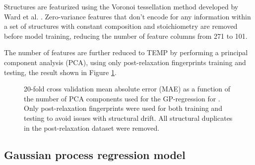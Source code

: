 Structures are featurized using the Voronoi tessellation method developed by Ward et al. \cite{Ward2017}. Zero-variance features that don't encode for any information within a set of structures with constant composition and stoichiometry are removed before model training, reducing the number of feature columns from \num{271} to \num{101}.

The number of features are further reduced to TEMP by performing a principal component analysis (PCA), using only post-relaxation fingerprints training and testing, the result shown in Figure \ref{fig:cv_anal}.





\begin{figure}[!htb]
\centering
{}
\caption{\label{fig:cv_anal}
20-fold cross validation mean absolute error (MAE) as a function of the number of PCA components used for the GP-regression for \IrOthree. Only post-relaxation fingerprints were used for both training and testing to avoid issues with structural drift. All structural duplicates in the post-relaxation dataset were removed.
}
\end{figure}


\subsection{Gaussian process regression model}  %
%


